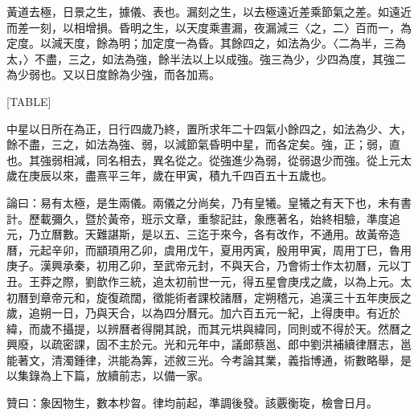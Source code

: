 \begin{pinyinscope}
黃道去極，日景之生，據儀、表也。漏刻之生，以去極遠近差乘節氣之差。如遠近而差一刻，以相增損。昏明之生，以天度乘晝漏，夜漏減三〈之，二〉百而一，為定度。以減天度，餘為明；加定度一為昏。其餘四之，如法為少。〈二為半，三為太，〉不盡，三之，如法為強，餘半法以上以成強。強三為少，少四為度，其強二為少弱也。又以日度餘為少強，而各加焉。

[TABLE]

中星以日所在為正，日行四歲乃終，置所求年二十四氣小餘四之，如法為少、大，餘不盡，三之，如法為強、弱，以減節氣昏明中星，而各定矣。強，正；弱，直也。其強弱相減，同名相去，異名從之。從強進少為弱，從弱退少而強。從上元太歲在庚辰以來，盡熹平三年，歲在甲寅，積九千四百五十五歲也。

論曰：易有太極，是生兩儀。兩儀之分尚矣，乃有皇犧。皇犧之有天下也，未有書計。歷載彌久，暨於黃帝，班示文章，重黎記註，象應著名，始終相驗，準度追元，乃立曆數。天難諶斯，是以五、三迄于來今，各有改作，不通用。故黃帝造曆，元起辛卯，而顓頊用乙卯，虞用戊午，夏用丙寅，殷用甲寅，周用丁巳，魯用庚子。漢興承秦，初用乙卯，至武帝元封，不與天合，乃會術士作太初曆，元以丁丑。王莽之際，劉歆作三統，追太初前世一元，得五星會庚戌之歲，以為上元。太初曆到章帝元和，旋復疏闊，徵能術者課校諸曆，定朔稽元，追漢三十五年庚辰之歲，追朔一日，乃與天合，以為四分曆元。加六百五元一紀，上得庚申。有近於緯，而歲不攝提，以辨曆者得開其說，而其元垬與緯同，同則或不得於天。然曆之興廢，以疏密課，固不主於元。光和元年中，議郎蔡邕、郎中劉洪補續律曆志，邕能著文，清濁鍾律，洪能為筭，述敘三光。今考論其業，義指博通，術數略舉，是以集錄為上下篇，放續前志，以備一家。

贊曰：象因物生，數本杪曶。律均前起，準調後發。該覈衡琁，檢會日月。


\end{pinyinscope}